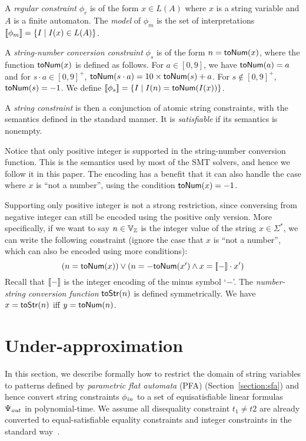 \documentclass[sigplan,review,anonymous]{acmart}\settopmatter{printfolios=true,printccs=false,printacmref=false}
\begin{document}
A \emph{regular constraint} $\phi_r$ is of the form $x \in L(A)$ where $x$ is a string variable and $A$ is a finite automaton. The \emph{model} of $\phi_m$ is the set of interpretations $[\![\phi_m]\!]=\{I\mid 
I(x) \in L(A) \}$. 

A \emph{string-number conversion constraint} $\phi_s$ is of the form $n=\mbox{\textsf{toNum}($x$)}$, where the function $\mbox{\textsf{toNum}($x$)}$ is defined as follows. For $a\in [0,9]$, we have $\mbox{\textsf{toNum}($a$)}=a$ and for $s \cdot a \in [0,9]^+$, $\mbox{\textsf{toNum}($s\cdot a$)} = 10\times \mbox{\textsf{toNum}($s$)}+a$. For $s\notin [0,9]^+$, $\mbox{\textsf{toNum}($s$)}=-1$. We define $[\![\phi_s]\!]= \{I \mid I(n)= \mbox{\textsf{toNum}($I(x)$)} \}$.

A \emph{string constraint} is then a conjunction of atomic string constraints, with the semantics defined in the standard manner. It is \emph{satisfiable} if its semantics is nonempty.

Notice that only positive integer is supported in the string-number conversion function. This is the semantics used by most of the SMT solvers, and hence we follow it in this paper. The encoding has a benefit that it can also handle the case where $x$ is ``not a number'', using the condition $\mbox{\textsf{toNum}($x$)} = -1$.

Supporting only positive integer is not a strong restriction, since conversing from negative integer can still be encoded using the positive only version. More specifically, if we want to say $n \in \mbox{$\mathbb{V}_{\mathbb{Z}}$}$ is the integer value of the string $x \in \Sigma^*$, we can write the following constraint (ignore the case that $x$ is ``not a number'', which can also be encoded using more conditions):
$$(n= \mbox{\textsf{toNum}($x$)}) \vee (n=-\mbox{\textsf{toNum}($x'$)} \wedge x = [\![-]\!]\cdot x')$$
Recall that $[\![-]\!]$ is the integer encoding of the minus symbol `$-$'. The \emph{number-string conversion function} $\mbox{\textsf{toStr}($n$)}$ is defined symmetrically. We have $x = \mbox{\textsf{toStr}($n$)}$ iff $y= \mbox{\textsf{toNum}($n$)}$. 


\section{Under-approximation} \label{section:under_approximate}
In this section, we describe formally how to restrict the domain of string variables to patterns defined by \emph{parametric flat automata} (PFA) (Section~\ref{section:sfa}) and hence convert string constraints $\phi_{\mathit{in}}$ to a set of equisatisfiable linear formulas $\Psi_{\mathit{out}}$ in polynomial-time. We assume all disequality constraint $t_1 \neq t2$ are already converted to equal-satisfiable equality constraints and integer constraints in the standard way~\cite{abdulla2015norn}. 
\end{document}
